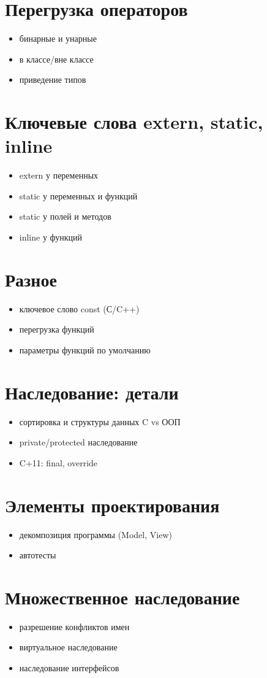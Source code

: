 \section{Перегрузка операторов}
\begin{itemize}
    \item бинарные и унарные
    \item в классе/вне классе
    \item приведение типов
\end{itemize}
\section{Ключевые слова extern, static, inline}
\begin{itemize}
    \item extern у переменных
    \item static у переменных и функций
    \item static у полей и методов
    \item inline у функций
\end{itemize}
\section{Разное}
\begin{itemize}
    \item ключевое слово const (С/C++)
    \item перегрузка функций
    \item параметры функций по умолчанию
\end{itemize}
\section{Наследование: детали}
\begin{itemize}
    \item сортировка и структуры данных C vs ООП
    \item private/protected наследование
    \item C+11: final, override
\end{itemize}
\section{Элементы проектирования}
\begin{itemize}
    \item декомпозиция программы (Model, View)
    \item автотесты
\end{itemize}
\section{Множественное наследование}
\begin{itemize}
    \item разрешение конфликтов имен
    \item виртуальное наследование
    \item наследование интерфейсов
\end{itemize}

% 
